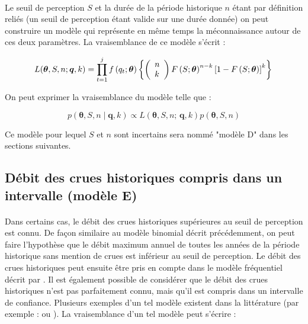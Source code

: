 \documentclass[11pt]{article}
\begin{document}
	\paragraph{}
	Le seuil de perception $S$ et la durée de la période historique $n$ étant par définition reliés (un seuil de perception étant valide sur une durée donnée) on peut construire un modèle qui représente en même temps la méconnaissance autour de ces deux paramètres. La vraisemblance de ce modèle s'écrit :  
	
					\begin{equation}
			L(\boldsymbol{\theta}, S, n ; \boldsymbol{q}, k) = \prod_{t=1}^j f\left(q_t;\boldsymbol{\theta}\right) \left\{\left(\begin{array}{l}
			n \\
			k
			\end{array}\right) F\left(S;\boldsymbol{\theta}\right)^{n-k}\left[1-F\left(S;\boldsymbol{\theta}\right)\right]^k\right\} \\
			\label{eq:Gev_Binom_SN}
			\end{equation}
		
		On peut exprimer la vraisemblance du modèle telle que :
					
			\begin{equation}
				p(\boldsymbol{\theta}, S, n \mid \boldsymbol{q},k) \propto L(\boldsymbol{\theta},S, n;\,\boldsymbol{q},k) p(\boldsymbol{\theta},S, n)
				\label{eq:Bayes_uSN}
			\end{equation}

	Ce modèle pour lequel $S$ et $n$ sont incertains sera nommé "modèle D" dans les sections suivantes. 
	
	\subsection{Débit des crues historiques compris dans un intervalle (modèle E)}
	\label{subsec:modE}	
		
	\paragraph{} Dans certains cas, le débit des crues historiques supérieures au seuil de perception est connu. De façon similaire au modèle binomial décrit précédemment, on peut faire l'hypothèse que le débit maximum annuel de toutes les années de la période historique sans mention de crues est inférieur au seuil de perception. Le débit des crues historiques peut ensuite être pris en compte dans le modèle fréquentiel décrit par \citet{stedinger_flood_1986}. Il est également possible de considérer que le débit des crues historiques n'est pas parfaitement connu, mais qu'il est compris dans un intervalle de confiance. Plusieurs exemples d'un tel modèle existent dans la littérature (par exemple : \cite{payrastre_usefulness_2011} ou \cite{parkes_defining_2016}). La vraisemblance d'un tel modèle peut s'écrire : 
\end{document}

